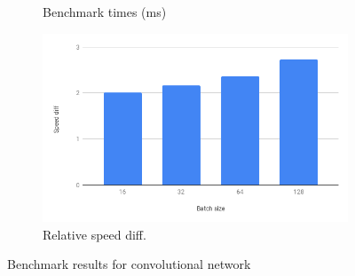 {\begin{figure}[!hbtp]
\begin{subfigure}[b]{0.49\textwidth}
			\caption{Benchmark times (ms)}
			\label{fig:speed}
		\end{subfigure}
		\begin{subfigure}[b]{0.49\textwidth}
			\includegraphics[width=\textwidth]{pics/speedupconv}	
			\caption{Relative speed diff.}
			\label{fig:mouse}
		\end{subfigure}
		\caption{Benchmark results for convolutional network}
		\label{fig:conv}
	\end{figure}
	
}
